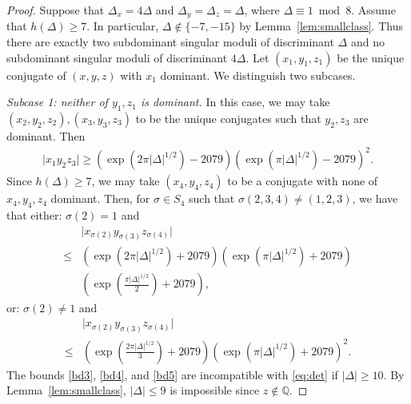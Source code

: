 \documentclass[11pt,a4paper, british]{amsart}
\theoremstyle{definition}
\theoremstyle{remark}
\numberwithin{equation}{section}
\newcommand{\Q}{\mathbb{Q}} %
\begin{document}
\begin{proof}
Suppose that $\Delta_x = 4 \Delta$ and $\Delta_y = \Delta_z = \Delta$, where $\Delta \equiv 1 \bmod 8$. Assume that $h(\Delta) \geq 7$. In particular, $\Delta \notin \{-7, -15\}$ by Lemma~\ref{lem:smallclass}. Thus there are exactly two subdominant singular moduli of discriminant $\Delta$ and no subdominant singular moduli of discriminant $4 \Delta$. Let $(x_1, y_1, z_1)$ be the unique conjugate of $(x, y, z)$ with $x_1$ dominant. We distinguish two subcases.

\textit{Subcase 1: neither of $y_1, z_1$ is dominant.} In this case, we may take $(x_2, y_2, z_2), (x_3, y_3, z_3)$ to be the unique conjugates such that $y_2, z_3$ are dominant. Then
\begin{align}\label{bd3}
	\lvert x_1 y_2 z_3 \rvert \geq (\exp(2 \pi \lvert \Delta \rvert^{1/2}) - 2079)(\exp(\pi \lvert \Delta \rvert^{1/2}) - 2079)^2.
\end{align}
Since $h(\Delta) \geq 7$, we may take $(x_4, y_4, z_4)$ to be a conjugate with none of $x_4, y_4, z_4$ dominant. Then, for $\sigma \in S_4$ such that $\sigma(2, 3, 4) \neq (1, 2, 3)$, we have that either: $\sigma(2)=1$ and
\begin{align}\label{bd4}
	&\lvert x_{\sigma(2)} y_{\sigma(3)} z_{\sigma(4)} \rvert \nonumber \\ 
	\leq &(\exp(2 \pi \lvert \Delta \rvert^{1/2}) + 2079)(\exp(\pi \lvert \Delta \rvert^{1/2}) + 2079)\nonumber \\ 
	&\left(\exp\left(\frac{\pi \lvert \Delta \rvert^{1/2}}{2}\right) + 2079\right),
\end{align}
or: $\sigma(2) \neq 1$ and
\begin{align}\label{bd5}
	&\lvert x_{\sigma(2)} y_{\sigma(3)} z_{\sigma(4)} \rvert \nonumber \\
	\leq &\left(\exp\left(\frac{2 \pi \lvert \Delta \rvert^{1/2}}{3}\right) + 2079\right)(\exp(\pi \lvert \Delta \rvert^{1/2}) + 2079)^2.
\end{align}
The bounds \eqref{bd3}, \eqref{bd4}, and \eqref{bd5} are incompatible with \eqref{eq:det} if $\lvert \Delta \rvert \geq 10$. By Lemma~\ref{lem:smallclass}, $\lvert \Delta \rvert \leq 9$ is impossible since $z \notin \Q$.


\end{proof}
\end{document}
